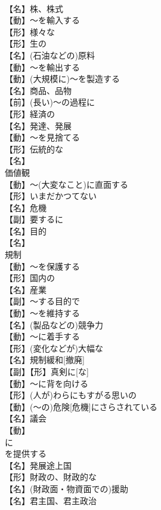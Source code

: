 \documentclass[8pt]{extreport}
\begin{document}
\begin{CJK}{UTF8}{min}
\\	【名】株、株式
\\	【動】～を輸入する
\\	【形】様々な
\\	【形】生の
\\	【名】(石油などの)原料
\\	【動】～を輸出する
\\	【動】(大規模に)～を製造する
\\	【名】商品、品物
\\	【前】(長い)～の過程に
\\	【形】経済の
\\	【名】発達、発展
\\	【動】～を見捨てる
\\	【形】伝統的な
\\	【名】
\\	価値観
\\	【動】～(大変なこと)に直面する
\\	【形】いまだかつてない
\\	【名】危機
\\	【副】要するに
\\	【名】目的
\\	【名】
\\	規制
\\	【動】～を保護する
\\	【形】国内の
\\	【名】産業
\\	【副】～する目的で
\\	【動】～を維持する
\\	【名】(製品などの)競争力
\\	【動】～に着手する
\\	【形】(変化などが)大幅な
\\	【名】規制緩和[撤廃]
\\	【副】【形】真剣に[な]
\\	【動】～に背を向ける
\\	【形】(人が)わらにもすがる思いの
\\	【動】(～の)危険[危機]にさらされている
\\	【名】議会
\\	【動】
\\	に
\\	を提供する
\\	【名】発展途上国
\\	【形】財政の、財政的な
\\	【名】(財政面・物資面での)援助
\\	【名】君主国、君主政治

\end{CJK}
\end{document}
